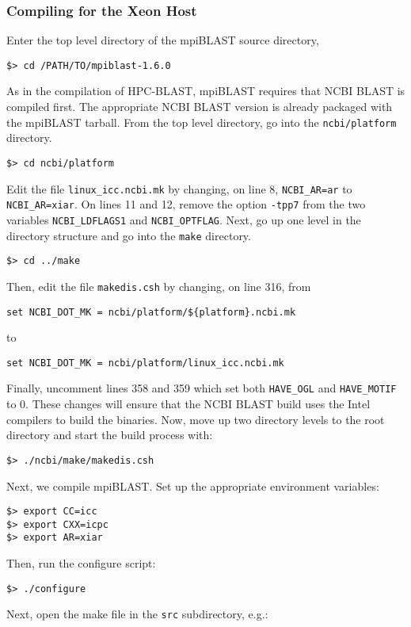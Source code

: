 \documentclass[10pt]{article}
\begin{document}
\subsubsection{Compiling for the Xeon Host} \label{sssec:mpiblasthost}
\noindent Enter the top level directory of the mpiBLAST source directory,
\begin{verbatim}
$> cd /PATH/TO/mpiblast-1.6.0
\end{verbatim}
\noindent As in the compilation of HPC-BLAST, mpiBLAST requires that NCBI BLAST is compiled first.  The appropriate NCBI BLAST version is already packaged with the mpiBLAST tarball.
From the top level directory, go into the \verb^ncbi/platform^ directory.
\begin{verbatim}
$> cd ncbi/platform
\end{verbatim}
\noindent Edit the file \verb^linux_icc.ncbi.mk^ by changing, on line 8, \verb^NCBI_AR=ar^ to \verb^NCBI_AR=xiar^.  On lines 11 and 12,
remove the option \verb^-tpp7^ from the two variables \verb^NCBI_LDFLAGS1^ and \verb^NCBI_OPTFLAG^.  Next, go up one level in
the directory structure and go into the \verb^make^ directory.
\begin{verbatim}
$> cd ../make
\end{verbatim}
\noindent Then, edit the file \verb^makedis.csh^ by changing, on line 316, from
\begin{verbatim}
set NCBI_DOT_MK = ncbi/platform/${platform}.ncbi.mk
\end{verbatim}
\noindent to
\begin{verbatim}
set NCBI_DOT_MK = ncbi/platform/linux_icc.ncbi.mk
\end{verbatim}
\noindent Finally, uncomment lines 358 and 359 which set both \verb^HAVE_OGL^ and \verb^HAVE_MOTIF^ to 0.
These changes will ensure that the NCBI BLAST build uses the Intel compilers to build the binaries.  Now, move up two directory levels to the root directory and start the build process with:
\begin{verbatim}
$> ./ncbi/make/makedis.csh
\end{verbatim}
\noindent Next, we compile mpiBLAST.  Set up the appropriate environment variables:
\begin{verbatim}
$> export CC=icc
$> export CXX=icpc
$> export AR=xiar
\end{verbatim}
\noindent Then, run the configure script:
\begin{verbatim}
$> ./configure
\end{verbatim}
\noindent Next, open the make file in the \verb^src^ subdirectory, e.g.:
\end{document}
